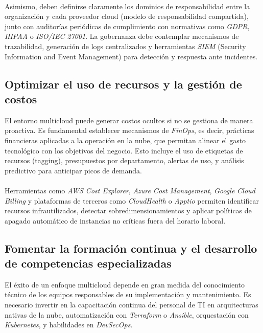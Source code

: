 {            \paragraph{}Asimismo, deben definirse claramente los dominios de responsabilidad entre la organización y cada proveedor cloud (modelo de responsabilidad compartida), junto con auditorías periódicas de cumplimiento con normativas como \textit{GDPR}, \textit{HIPAA} o \textit{ISO/IEC 27001}. La gobernanza debe contemplar mecanismos de trazabilidad, generación de logs centralizados y herramientas \textit{SIEM} (Security Information and Event Management) para detección y respuesta ante incidentes.
            
        \subsection{Optimizar el uso de recursos y la gestión de costos}
            El entorno multicloud puede generar costos ocultos si no se gestiona de manera proactiva. Es fundamental establecer mecanismos de \textit{FinOps}, es decir, prácticas financieras aplicadas a la operación en la nube, que permitan alinear el gasto tecnológico con los objetivos del negocio. Esto incluye el uso de etiquetas de recursos (tagging), presupuestos por departamento, alertas de uso, y análisis predictivo para anticipar picos de demanda.
            
            \paragraph{}Herramientas como \textit{AWS Cost Explorer}, \textit{Azure Cost Management}, \textit{Google Cloud Billing} y plataformas de terceros como \textit{CloudHealth} o \textit{Apptio} permiten identificar recursos infrautilizados, detectar sobredimensionamientos y aplicar políticas de apagado automático de instancias no críticas fuera del horario laboral.
            
        \subsection{Fomentar la formación continua y el desarrollo de competencias especializadas}
            El éxito de un enfoque multicloud depende en gran medida del conocimiento técnico de los equipos responsables de su implementación y mantenimiento. Es necesario invertir en la capacitación continua del personal de TI en arquitecturas nativas de la nube, automatización con \textit{Terraform} o \textit{Ansible}, orquestación con \textit{Kubernetes}, y habilidades en \textit{DevSecOps}.
            
}
